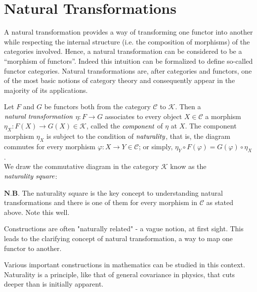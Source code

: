 \section{Natural Transformations} %
\label{sec:natural transformations}
A natural transformation provides a way of transforming one functor into another
while respecting the internal structure (i.e. the composition of morphisms) of the categories involved.
Hence, a natural transformation can be considered to be a ``morphism of functors''.
Indeed this intuition can be formalized to define so-called functor categories.
Natural transformations are, after categories and functors, one of the most basic notions of category theory
and consequently appear in the majority of its applications.

\begin{defn}
 Let $F$ and $G$ be functors both from the category $\mathcal{C}$ to $\mathcal{K}$.
 Then a $\emph{natural transformation}$ $\eta : F \to G$ associates to every object
 $X \in \mathcal{C}$ a morphism $\eta_{X} : F(X) \to G(X) \in \mathcal{K}$, called the $\emph{component}$
 of $\eta$ at $X$. The component morphism $\eta_{X}$ is subject to the condition of $\emph{naturality}$,
 that is, the diagram commutes for every morphism $\varphi: X \to Y \in \mathcal{C}$; or simply,
 $\eta_{Y} \circ F(\varphi) = G(\varphi) \circ \eta_{X}$.
 \\
 We draw the commutative diagram in the category $\mathcal{K}$ know as the $\emph{naturality square}$:
\end{defn}
\begin{rem}
 $\textbf{N.B.}$ The naturality square is the key concept to understanding natural transformations and
 there is one of them for every morphism in $\mathcal{C}$ as stated above. Note this well.
\end{rem}

Constructions are often "naturally related" - a vague notion, at first sight.
This leads to the clarifying concept of natural transformation, a way to map one functor to another.
\begin{rem}
 Various important constructions in mathematics can be studied in this context.
 Naturality is a principle, like that of general covariance in physics, that cuts deeper than is initially apparent.
\end{rem}